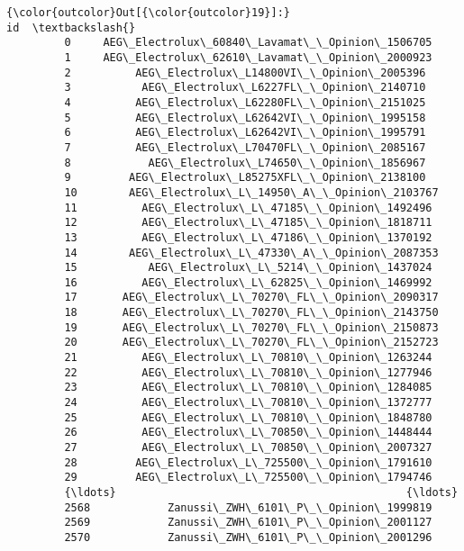 \documentclass{article}
\begin{document}
            \begin{Verbatim}[commandchars=\\\{\}]
{\color{outcolor}Out[{\color{outcolor}19}]:}                                                  id  \textbackslash{}
         0     AEG\_Electrolux\_60840\_Lavamat\_\_Opinion\_1506705   
         1     AEG\_Electrolux\_62610\_Lavamat\_\_Opinion\_2000923   
         2          AEG\_Electrolux\_L14800VI\_\_Opinion\_2005396   
         3           AEG\_Electrolux\_L6227FL\_\_Opinion\_2140710   
         4          AEG\_Electrolux\_L62280FL\_\_Opinion\_2151025   
         5          AEG\_Electrolux\_L62642VI\_\_Opinion\_1995158   
         6          AEG\_Electrolux\_L62642VI\_\_Opinion\_1995791   
         7          AEG\_Electrolux\_L70470FL\_\_Opinion\_2085167   
         8            AEG\_Electrolux\_L74650\_\_Opinion\_1856967   
         9         AEG\_Electrolux\_L85275XFL\_\_Opinion\_2138100   
         10        AEG\_Electrolux\_L\_14950\_A\_\_Opinion\_2103767   
         11          AEG\_Electrolux\_L\_47185\_\_Opinion\_1492496   
         12          AEG\_Electrolux\_L\_47185\_\_Opinion\_1818711   
         13          AEG\_Electrolux\_L\_47186\_\_Opinion\_1370192   
         14        AEG\_Electrolux\_L\_47330\_A\_\_Opinion\_2087353   
         15           AEG\_Electrolux\_L\_5214\_\_Opinion\_1437024   
         16          AEG\_Electrolux\_L\_62825\_\_Opinion\_1469992   
         17       AEG\_Electrolux\_L\_70270\_FL\_\_Opinion\_2090317   
         18       AEG\_Electrolux\_L\_70270\_FL\_\_Opinion\_2143750   
         19       AEG\_Electrolux\_L\_70270\_FL\_\_Opinion\_2150873   
         20       AEG\_Electrolux\_L\_70270\_FL\_\_Opinion\_2152723   
         21          AEG\_Electrolux\_L\_70810\_\_Opinion\_1263244   
         22          AEG\_Electrolux\_L\_70810\_\_Opinion\_1277946   
         23          AEG\_Electrolux\_L\_70810\_\_Opinion\_1284085   
         24          AEG\_Electrolux\_L\_70810\_\_Opinion\_1372777   
         25          AEG\_Electrolux\_L\_70810\_\_Opinion\_1848780   
         26          AEG\_Electrolux\_L\_70850\_\_Opinion\_1448444   
         27          AEG\_Electrolux\_L\_70850\_\_Opinion\_2007327   
         28         AEG\_Electrolux\_L\_725500\_\_Opinion\_1791610   
         29         AEG\_Electrolux\_L\_725500\_\_Opinion\_1794746   
         {\ldots}                                             {\ldots}   
         2568            Zanussi\_ZWH\_6101\_P\_\_Opinion\_1999819   
         2569            Zanussi\_ZWH\_6101\_P\_\_Opinion\_2001127   
         2570            Zanussi\_ZWH\_6101\_P\_\_Opinion\_2001296   

\end{Verbatim}
\end{document}

